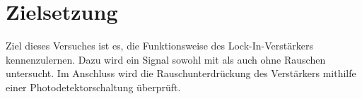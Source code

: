 \section{Zielsetzung}
\label{sec:Zielsetzung}
Ziel dieses Versuches ist es, die Funktionsweise des Lock-In-Verstärkers 
kennenzulernen. Dazu wird ein Signal sowohl mit als auch ohne Rauschen 
untersucht. Im Anschluss wird die Rauschunterdrückung des Verstärkers mithilfe
einer Photodetektorschaltung überprüft.
